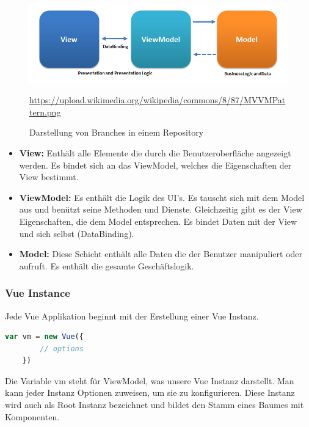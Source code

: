 \begin{figure}[htp]
    \centering
    \includegraphics[scale=0.7]{pics/MVVMPattern.png}
    \caption{Darstellung von Branches in einem Repository}
        \small \url{https://upload.wikimedia.org/wikipedia/commons/8/87/MVVMPattern.png}
    \label{fig:impl:MVVM}
\end{figure}

\begin{itemize}
    \item \textbf{View:} Enthält alle Elemente die durch die Benutzeroberfläche angezeigt werden. Es bindet sich an das ViewModel, welches die Eigenschaften der View bestimmt.
    \item \textbf{ViewModel:} Es enthält die Logik des UI's. Es tauscht sich mit dem Model aus und benützt seine Methoden und Dienste. Gleichzeitig
          gibt es der View Eigenschaften, die dem Model entsprechen. Es bindet Daten mit der View und sich selbst (DataBinding).
    \item \textbf{Model:} Diese Schicht enthält alle Daten die der Benutzer manipuliert oder aufruft. Es enthält die gesamte Geschäftslogik.\cite{MVVM}
\end{itemize}

\clearpage

\subsubsection{Vue Instance}

Jede Vue Applikation beginnt mit der Erstellung einer Vue Instanz.

\begin{lstlisting}[language=JavaScript,caption=Vue Instanz,label=lst:impl:foo]
    var vm = new Vue({
        // options
    }) 
\end{lstlisting}

Die Variable vm steht für ViewModel, was unsere Vue Instanz darstellt. Man kann jeder Instanz Optionen zuweisen, um sie zu konfigurieren.
Diese Instanz wird auch als Root Instanz bezeichnet und bildet den Stamm eines Baumes mit Komponenten. 

